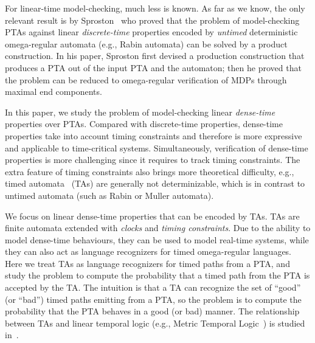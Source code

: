 For linear-time model-checking, much less is known.
As far as we know, the only relevant result is by Sproston~\cite{DBLP:conf/qest/Sproston11} who proved that the problem of model-checking PTAs against linear \emph{discrete-time} properties encoded by \emph{untimed} deterministic omega-regular automata (e.g., Rabin automata) can be solved by a product construction.
In his paper, Sproston first devised a production construction that produces a PTA out of the input PTA and the automaton;
then he proved that the problem can be reduced to omega-regular verification of MDPs through maximal end components.

In this paper, we study the problem of model-checking linear \emph{dense-time} properties over PTAs.
Compared with discrete-time properties, dense-time properties take into account timing constraints and therefore is more expressive and applicable to time-critical systems.
Simultaneously, verification of dense-time properties is more challenging since it requires to track timing constraints.
The extra feature of timing constraints also brings more theoretical difficulty, e.g.,
timed automata~\cite{DBLP:journals/tcs/AlurD94} (TAs) are generally not determinizable,
which is in contrast to untimed automata (such as Rabin or Muller automata).

We focus on linear dense-time properties that can be encoded by TAs.
TAs are finite automata extended with \emph{clocks} and \emph{timing constraints}.
Due to the ability to model dense-time behaviours,
they can be used to model real-time systems, while they can also act as language recognizers for timed omega-regular languages.
Here we treat TAs as language recognizers for timed paths from a PTA, and study
the problem to compute the probability that a timed path from the PTA is accepted by the TA.
The intuition is that a TA can recognize the set of ``good'' (or ``bad'') timed paths emitting from a PTA,
so the problem is to compute the probability that the PTA behaves in a good (or bad) manner.
The relationship between TAs and linear temporal logic (e.g., Metric Temporal Logic~\cite{DBLP:journals/rts/Koymans90}) is studied in~\cite{DBLP:conf/lics/OuaknineW05,DBLP:journals/jacm/AlurFH96}.


